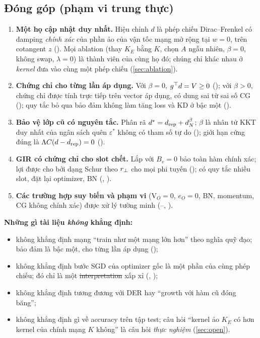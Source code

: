 \subsection{Đóng góp (phạm vi trung thực)}

\begin{enumerate}[label=(C\arabic*)]
  \item \textbf{Một họ cập nhật duy nhất.} Hiệu chỉnh $d$ là phép chiếu Dirac--Frenkel có damping \emph{chính xác} của phần ảo của vận tốc mạng mở rộng tại $w=0$, trên cotangent $z$ (). Mọi ablation (thay $K_E$ bằng $K$, chọn $A$ ngẫu nhiên, $\beta=0$, không swap, $\lambda=0$) là thành viên của cùng họ đó; chúng chỉ khác nhau ở \emph{kernel} đưa vào cùng một phép chiếu (\cref{sec:ablation}).
  \item \textbf{Chứng chỉ cho từng lần áp dụng.} Với $\beta=0$, $g^{\top} d=V\ge 0$ (); với $\beta>0$, chứng chỉ được tính trực tiếp trên vector áp dụng, có dung sai từ sai số CG (); quy tắc bỏ qua bảo đảm không làm tăng loss và KD ở bậc một ().
  \item \textbf{Bảo vệ lớp cũ có nguyên tắc.} Phân rã $d^*=d_{\mathrm{rep}}+d_N^{\beta}$; $\beta$ là nhân tử KKT duy nhất của ngân sách quên $\varepsilon^*$ không có tham số tự do (); giới hạn cứng đúng là $\Lambda C(d-d_{\mathrm{rep}})=0$ ().
  \item \textbf{GIR có chứng chỉ cho slot chết.} Lắp với $B_v=0$ bảo toàn hàm chính xác; lợi được cho bởi dạng Schur theo $r_{\perp}$ cho mọi phi tuyến (); có quy tắc nhiều slot, đặt lại optimizer, BN (, ).
  \item \textbf{Các trường hợp suy biến và phạm vi} (V$_O=0$, $e_O=0$, BN, momentum, CG không chính xác) được xử lý tường minh (--, ).
\end{enumerate}

\textbf{Những gì tài liệu \emph{không} khẳng định:}
\begin{itemize}
  \item không khẳng định mạng ``train như một mạng lớn hơn'' theo nghĩa quỹ đạo; bảo đảm là bậc một, cho từng lần áp dụng ();
  \item không khẳng định bước SGD của optimizer gốc là một phần của cùng phép chiếu; đó chỉ là một \st{interpretation} xấp xỉ (, );
  \item không khẳng định tương đương với DER hay ``growth với hàm cũ đóng băng'';
  \item không khẳng định gì về accuracy trên tập test; câu hỏi ``kernel ảo $K_E$ có hơn kernel của chính mạng $K$ không'' là câu hỏi \emph{thực nghiệm} (\cref{sec:open}).
\end{itemize}

